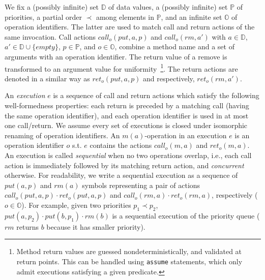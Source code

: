 We fix a (possibly infinite) set $\mathbb{D}$ of data values, a (possibly infinite) set $\mathbb{P}$ of priorities, a partial order $\prec$ among elements in $\mathbb{P}$, and an infinite set $\mathbb{O}$ of operation identifiers.
The latter are used to match call and return actions of the same invocation. Call actions $\textit{call}_o(\textit{put},a,p)$ and $\textit{call}_o(\textit{rm},a')$ with $a\in \mathbb{D}$, $a'\in \mathbb{D}\cup\{\textit{empty}\}$, $p \in \mathbb{P}$, and $o \in \mathbb{O}$, combine a method name and a set of arguments with an operation identifier. The return value of a remove is transformed to an argument value for uniformity~\footnote{Method return values are guessed nondeterministically, and validated at return points.
This can be handled using {\tt assume} statements, which only admit executions satisfying a given predicate.}.
The return actions are denoted in a similar way as $\textit{ret}_o(\textit{put},a,p)$ and respectively, $\textit{ret}_o(\textit{rm},a')$.

An \emph{execution} $e$ is a sequence of call and return actions which satisfy the following well-formedness properties: each return is preceded by a matching call (having the same operation identifier), and each operation identifier is used in at most one call/return. We assume every set of executions is closed under isomorphic renaming of operation identifiers. An $m(a)$-operation in an execution $e$ is an operation identifier $o$ s.t. $e$ contains the actions $\textit{call}_o(m,a)$ and $\textit{ret}_o(m,a)$.
An execution is called \emph{sequential} when no two operations overlap, i.e., each call action is immediately followed by its matching return action, and \emph{concurrent} otherwise. For readability, we write a sequential execution as a sequence of $\textit{put}(a,p)$ and $\textit{rm}(a)$ symbols representing a pair of actions $\textit{call}_o(\textit{put},a,p)\cdot \textit{ret}_o(\textit{put},a,p)$ and $\textit{call}_o(\textit{rm},a)\cdot \textit{ret}_o(\textit{rm},a)$, respectively ($o\in\mathbb{O}$). For example, given two priorities $p_1 \prec p_2$, $\textit{put}(a,p_2) \cdot \textit{put}(b,p_1) \cdot \textit{rm}(b)$ is a sequential execution of the priority queue ($\textit{rm}$ returns $b$ because it has smaller priority).

